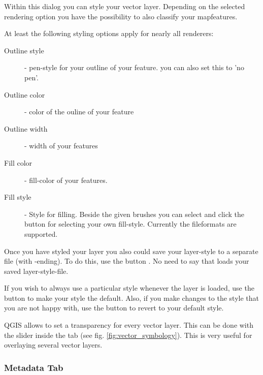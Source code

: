 
 \label{sec:style_options} 
Within this dialog you can style your vector layer. Depending on the selected
rendering option you have the possibility to also classify your mapfeatures.

At least the following styling options apply for nearly all renderers:
\begin{description}
 \item[Outline style] - pen-style for your outline of your feature. you can
 also set this to 'no pen'.
 \item[Outline color] - color of the ouline of your feature
 \item[Outline width] - width of your features
 \item[Fill color] - fill-color of your features.
 \item[Fill style] - Style for filling. Beside the given brushes you can
 select  and click the \browsebutton
 button for selecting your own fill-style. Currently the fileformats
  are supported.
\end{description}

Once you have styled your layer you also could save your layer-style to a
separate file (with -ending).
To do this, use the button . No need to say that
 loads your saved layer-style-file.

If you wish to always use a particular style whenever the layer is loaded, 
use the  button to make your style the default. Also, 
if you make changes to the style that you are not happy with, use the  button to revert to your default style.

 \label{sec:vect_transparency} 
QGIS \CURRENT allows to set a transparency for every vector layer. This can be done with
the slider  inside the  tab (see fig. \ref{fig:vector_symbology}).
This is very useful for overlaying several vector layers.

\subsubsection{Metadata Tab}

